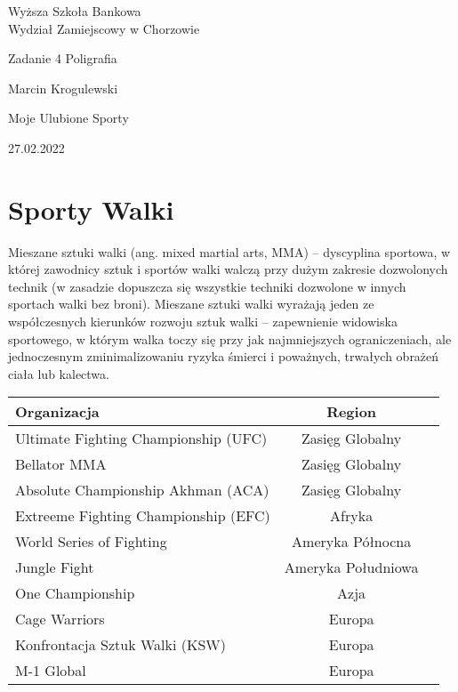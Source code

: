 \documentclass[14pt,oneside,a4paper]{book}
\theoremstyle{break}
\begin{document}
\thispagestyle{empty}
\begin{center}{\sc \Large
Wyższa Szkoła Bankowa\\
Wydział Zamiejscowy w Chorzowie}\par\vspace{0.2cm}\par
{\large
Zadanie 4 Poligrafia
}
\end{center}
\vspace{5cm}
\begin{center}
{\large
Marcin Krogulewski
}\par\vspace{0.2cm}\par
{\LARGE
Moje Ulubione Sporty
}
\end{center}
\vspace{4cm}
\begin{flushright}


\end{flushright}
\vfill
\begin{center}
27.02.2022
\end{center}

\newpage

\thispagestyle{empty} \setcounter{page}{0} \tableofcontents

\chapter*{Sporty Walki}


Mieszane sztuki walki (ang. mixed martial arts, MMA) – dyscyplina sportowa, w której zawodnicy sztuk i sportów walki walczą przy dużym zakresie dozwolonych technik (w zasadzie dopuszcza się wszystkie techniki dozwolone w innych sportach walki bez broni). Mieszane sztuki walki wyrażają jeden ze współczesnych kierunków rozwoju sztuk walki – zapewnienie widowiska sportowego, w którym walka toczy się przy jak najmniejszych ograniczeniach, ale jednoczesnym zminimalizowaniu ryzyka śmierci i poważnych, trwałych obrażeń ciała lub kalectwa.


\begin{tabular}{|lc|r|}

\hline
Organizacja & Region\\
\hline
Ultimate Fighting Championship (UFC) &  Zasięg Globalny\\
Bellator MMA &  Zasięg Globalny\\
Absolute Championship Akhman (ACA) &  Zasięg Globalny\\
Extreeme Fighting Championship (EFC) &  Afryka\\
World Series of Fighting &  Ameryka Północna\\
Jungle Fight &  Ameryka Południowa\\
One Championship &  Azja\\
Cage Warriors &  Europa\\
Konfrontacja Sztuk Walki (KSW) &  Europa\\
M-1 Global &  Europa\\
\hline
\end{tabular}
\end{document}
